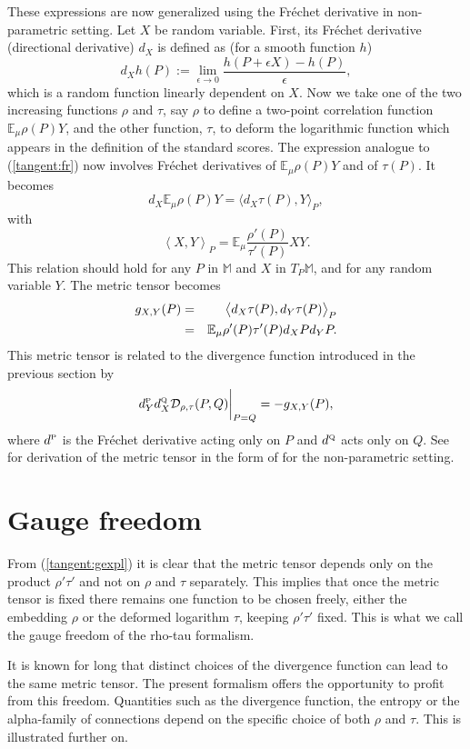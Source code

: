 \documentclass[graybox]{svmult}
\newcommand{\be}{\begin{equation}}
\newcommand{\ee}{\end{equation}}
\newcommand{\beq}{\begin{eqnarray}}
\newcommand{\eeq}{\end{eqnarray}}
\newcommand{\Mo}{\mathbb M}
\newcommand{\Eo}{\mathbb E}
\newcommand{\Ddiv}{\mathcal{D}}
\newcommand{\Dfrechet}{d}  %
\begin{document}
These expressions are now generalized using the Fr\'echet derivative in non-parametric setting. Let $X$ be random variable. First, its Fr\'echet derivative (directional derivative) $\Dfrechet_X$ is defined as (for a smooth function $h$)
$$
\Dfrechet_X  h(P) := \lim_{\epsilon \rightarrow 0}  \frac{h(P+ \epsilon X)-h(P)}{\epsilon} ,$$
which is a random function linearly dependent on $X$. Now we take one of the two increasing functions $\rho$ and $\tau$, say $\rho$ to define a two-point
correlation function $\Eo_\mu\rho(P)Y$, and the other function, $\tau$, to deform the logarithmic function which appears in the definition of the standard scores.
The expression analogue to (\ref{tangent:fr}) now
involves Fr\'echet derivatives of $\Eo_\mu\rho(P) Y$ and of $\tau(P)$. It becomes
\be
\Dfrechet_X\Eo_\mu\rho(P) Y=\big\langle \Dfrechet_X\tau(P),Y\big\rangle_P,
\label{tangent:frgen}
\ee
with
\be
\left\langle X,Y\right\rangle_P=\Eo_\mu\frac{\rho'(P)}{\tau'(P)}XY.
\nonumber
\ee
This relation should hold for any $P$ in $\Mo$ and $X$ in $T_P\Mo$, and for any random variable $Y$. 
The metric tensor becomes
\beq
g_{X,Y}(P)
&=&\big\langle \Dfrechet_X\tau(P),\Dfrechet_Y\tau(P)\big\rangle_P\cr
&=&\Eo_\mu\rho'(P)\tau'(P)\Dfrechet_X P\Dfrechet_Y P.
\label{tangent:gexpl}
\eeq
This metric tensor is related to the divergence function introduced in the previous
section by
\be
\Dfrechet^{\mbox{\tiny P}}_Y\Dfrechet^{\mbox{\tiny Q}}_X \Ddiv _{\rho,\tau}(P,Q)
\bigg|_{P=Q}
=-g_{X,Y}(P),
\nonumber
\ee
where $\Dfrechet^{\mbox{\tiny P}}$ is the Fr\'echet derivative acting only on $P$ and 
$\Dfrechet^{\mbox{\tiny Q}}$ acts only on $Q$. See \cite{zhang13} for derivation of the metric tensor in the form of \label{tangent:gexpl} for the non-parametric setting. 

\section{Gauge freedom}
\label{sect:gauge}

From (\ref {tangent:gexpl}) it is clear that the metric tensor depends only
on the product $\rho'\tau'$ and not on $\rho$ and $\tau$ separately.
This  implies that once the metric tensor is fixed there remains one 
function to be chosen freely, either the embedding $\rho$ or the 
deformed logarithm $\tau$, keeping $\rho'\tau'$ fixed.
This is what we call the gauge freedom of the rho-tau formalism.

It is known for long that distinct choices of the divergence function
can lead to the same metric tensor. The present formalism offers
the opportunity to profit from this freedom. Quantities such as
the divergence function, the entropy or the alpha-family
of connections depend on the specific choice of both $\rho$ and $\tau$.
This is illustrated further on.
\end{document}
